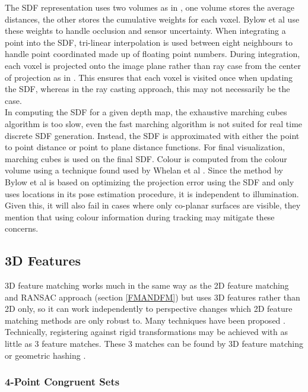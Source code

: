 The SDF representation uses two volumes as in \cite{Curless96Volumetric}, one volume stores the average distances, the other stores the cumulative weights for each voxel. Bylow et al use these weights to handle occlusion and sensor uncertainty. When integrating a point into the SDF, tri-linear interpolation is used between eight neighbours to handle point coordinated made up of floating point numbers. During integration, each voxel is projected onto the image plane rather than ray case from the center of projection as in \cite{Newcombe11Kinectfusion}. This ensures that each voxel is visited once when updating the SDF, whereas in the ray casting approach, this may not necessarily be the case. \\

In computing the SDF for a given depth map, the exhaustive marching cubes algorithm is too slow, even the fast marching algorithm \cite{Baerentzen01Implementation} is not suited for real time discrete SDF generation. Instead, the SDF is approximated with either the point to point distance or point to plane distance functions. For final visualization, marching cubes is used \cite{Lorensen87Marching} on the final SDF. Colour is computed from the colour volume using a technique found used by Whelan et al \cite{Whelan13Robust}. Since the method by Bylow et al is based on optimizing the projection error using the SDF and only uses locations in its pose estimation procedure, it is independent to illumination. Given this, it will also fail in cases where only co-planar surfaces are visible, they mention that using colour information during tracking \cite{Kerl13Robust} may mitigate these concerns.


\subsection{3D Features}

3D feature matching works much in the same way as the 2D feature matching and RANSAC approach (section \ref{FMANDFM}) but uses 3D features rather than 2D only, so it can work independently to perspective changes which 2D feature matching methods are only robust to. Many techniques have been proposed \cite{Scovanner073Dimensional,Flitton10Object,Li05Multiscale}. Technically, registering against rigid transformations may be achieved with as little as 3 feature matches. These 3 matches can be found by 3D feature matching or geometric hashing \cite{Wolfson97Geometric}.

\subsubsection{4-Point Congruent Sets}

